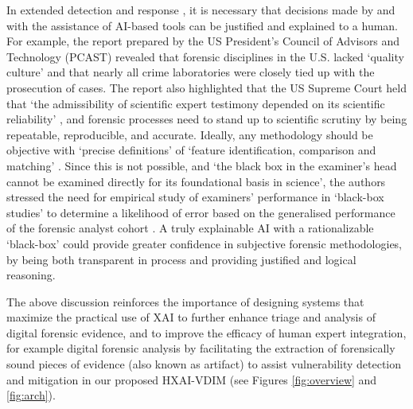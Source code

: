 In extended detection and response \cite{FirstbrookLawsonGartner2021}, it is necessary that decisions made by and with the assistance of AI-based tools can be justified and explained to a human. For example, the report prepared by the US President's Council of Advisors and Technology (PCAST) \cite{NationalDistrictAttorneysAssociationPCAST} revealed that forensic disciplines in the U.S. lacked ‘quality culture’  \cite[p.33]{NationalDistrictAttorneysAssociationPCAST} and that nearly all crime laboratories were closely tied up with the prosecution of cases. The report also highlighted that the US Supreme Court held that ‘the admissibility of scientific expert testimony depended on its scientific reliability’ \cite[p.41]{NationalDistrictAttorneysAssociationPCAST}, and  forensic processes need to stand up to scientific scrutiny by being repeatable, reproducible, and accurate. Ideally, any methodology should be objective with ‘precise definitions’ of ‘feature identification, comparison and matching’ \cite[p.48]{NationalDistrictAttorneysAssociationPCAST}. Since this is not possible, and ‘the black box in the examiner’s head cannot be examined directly for its foundational basis in science’, the authors stressed the need for empirical study of examiners’ performance in ‘black-box studies’ to determine a likelihood of error based on the generalised performance of the forensic analyst cohort  \cite[p.49]{NationalDistrictAttorneysAssociationPCAST}. A truly explainable AI with a rationalizable ‘black-box’ could provide greater confidence in subjective forensic methodologies, by being both transparent in process and providing justified and logical reasoning.

The above discussion reinforces the importance of designing systems that maximize the practical use of XAI to further enhance triage and analysis of digital forensic evidence, and to improve the efficacy of human expert integration, for example  digital forensic analysis by facilitating the extraction of forensically sound pieces of evidence (also known as artifact) to assist vulnerability detection and mitigation in our proposed HXAI-VDIM (see Figures \ref{fig:overview} and \ref{fig:arch}).
